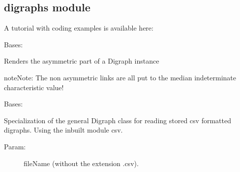 \documentclass[letterpaper,10pt,english]{sphinxmanual}
\begin{document}
\subsection{digraphs module}
\label{techDoc:digraphs-label}\label{techDoc:digraphs-module}
A tutorial with coding examples is available here: {\hyperref[tutorial:digraphs-tutorial-label]{\emph{}}}
\label{techDoc:module-digraphs}

\begin{fulllineitems}
\label{techDoc:digraphs.AsymmetricPartialDigraph}
Bases: {\hyperref[techDoc:digraphs.Digraph]{\emph{}}}

Renders the asymmetric part of a Digraph instance

\begin{notice}{note}{Note:}
The non asymmetric links are all put to the median indeterminate
characteristic value!
\end{notice}

\end{fulllineitems}


\begin{fulllineitems}
\label{techDoc:digraphs.CSVDigraph}
Bases: {\hyperref[techDoc:digraphs.Digraph]{\emph{}}}

Specialization of the general Digraph class for reading
stored csv formatted digraphs. Using the inbuilt module csv.
\begin{description}
\item[{Param:}] \leavevmode
fileName (without the extension .csv).

\end{description}

\begin{fulllineitems}
\label{techDoc:digraphs.CSVDigraph.showAll}
\end{fulllineitems}


\end{fulllineitems}
\end{document}
